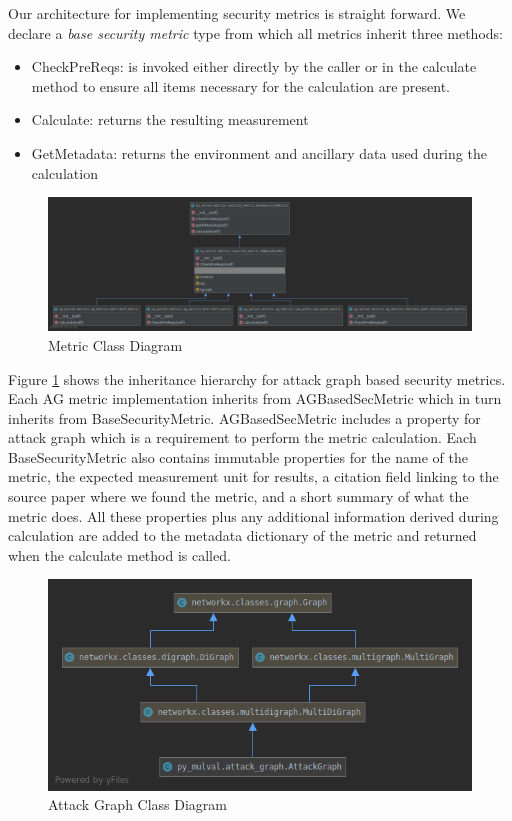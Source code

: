 
Our architecture for implementing security metrics is straight forward. We declare a \textit{base security metric} type from which all metrics inherit three methods: 
\begin{itemize}
\item CheckPreReqs: is invoked either directly by the caller or in the calculate method to ensure all items necessary for the calculation are present.
\item Calculate: returns the resulting measurement
\item GetMetadata: returns the environment and ancillary data used during the calculation 
\end{itemize}
 
\begin{figure}[H]
\centering
\includegraphics[width=.95\linewidth]{resource/img/ch_automation/metrics_class_uml.png}
\caption{Metric Class Diagram}
\label{fig:automation:metric_uml}
\end{figure} 

Figure \ref{fig:automation:metric_uml} shows the inheritance hierarchy for attack graph based security metrics. Each AG metric implementation inherits from AGBasedSecMetric which in turn inherits from BaseSecurityMetric. AGBasedSecMetric includes a property for attack graph which is a requirement to perform the metric calculation. Each BaseSecurityMetric also contains immutable properties for the name of the metric, the expected measurement unit for results, a citation field linking to the source paper where we found the metric, and a short summary of what the metric does. All these properties plus any additional information derived during calculation are added to the metadata dictionary of the metric and returned when the calculate method is called. 


\begin{figure}[H]
\centering
\includegraphics[width=.95\linewidth]{resource/img/ch_automation/attack_graph_simple_uml.png}
\caption{Attack Graph Class Diagram}
\label{fig:automation:ag_uml}
\end{figure} 

